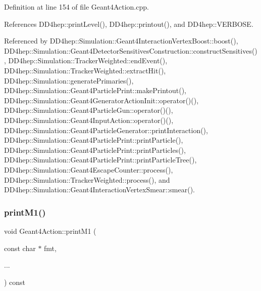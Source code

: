 Definition at line 154 of file Geant4\+Action.\+cpp.



References D\+D4hep\+::print\+Level(), D\+D4hep\+::printout(), and D\+D4hep\+::\+V\+E\+R\+B\+O\+SE.



Referenced by D\+D4hep\+::\+Simulation\+::\+Geant4\+Interaction\+Vertex\+Boost\+::boost(), D\+D4hep\+::\+Simulation\+::\+Geant4\+Detector\+Sensitives\+Construction\+::construct\+Sensitives(), D\+D4hep\+::\+Simulation\+::\+Tracker\+Weighted\+::end\+Event(), D\+D4hep\+::\+Simulation\+::\+Tracker\+Weighted\+::extract\+Hit(), D\+D4hep\+::\+Simulation\+::generate\+Primaries(), D\+D4hep\+::\+Simulation\+::\+Geant4\+Particle\+Print\+::make\+Printout(), D\+D4hep\+::\+Simulation\+::\+Geant4\+Generator\+Action\+Init\+::operator()(), D\+D4hep\+::\+Simulation\+::\+Geant4\+Particle\+Gun\+::operator()(), D\+D4hep\+::\+Simulation\+::\+Geant4\+Input\+Action\+::operator()(), D\+D4hep\+::\+Simulation\+::\+Geant4\+Particle\+Generator\+::print\+Interaction(), D\+D4hep\+::\+Simulation\+::\+Geant4\+Particle\+Print\+::print\+Particle(), D\+D4hep\+::\+Simulation\+::\+Geant4\+Particle\+Print\+::print\+Particles(), D\+D4hep\+::\+Simulation\+::\+Geant4\+Particle\+Print\+::print\+Particle\+Tree(), D\+D4hep\+::\+Simulation\+::\+Geant4\+Escape\+Counter\+::process(), D\+D4hep\+::\+Simulation\+::\+Tracker\+Weighted\+::process(), and D\+D4hep\+::\+Simulation\+::\+Geant4\+Interaction\+Vertex\+Smear\+::smear().

\hypertarget{class_d_d4hep_1_1_simulation_1_1_geant4_action_ada091d86e8b88d764d13b4cd79f8543d}{}\label{class_d_d4hep_1_1_simulation_1_1_geant4_action_ada091d86e8b88d764d13b4cd79f8543d} 
\subsubsection{\texorpdfstring{print\+M1()}{printM1()}}
{\footnotesize\ttfamily void Geant4\+Action\+::print\+M1 (\begin{DoxyParamCaption}\item[{const char $\ast$}]{fmt,  }\item[{}]{... }\end{DoxyParamCaption}) const}



